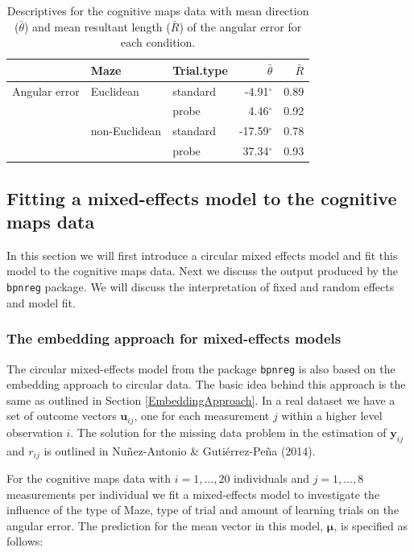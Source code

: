 \documentclass[11pt,]{article}
\begin{document}
\begin{table}
\centering
\caption{Descriptives for the cognitive maps data with mean direction ($\bar{\theta}$) and mean resultant length ($\bar{R}$) of the angular error for each condition.} 
\begin{tabular}{lllrr}
  \hline\noalign{\smallskip}
& Maze & Trial.type & $\bar{\theta}$ & $\bar{R}$  \\ \hline\noalign{\smallskip}
Angular error   & Euclidean     & standard & -4.91$^{\circ}$ & 0.89  \\
              &                   & probe    &  4.46$^{\circ}$ & 0.92   \\
                & non-Euclidean & standard & -17.59$^{\circ}$ & 0.78  \\
              &                   & probe    &  37.34$^{\circ}$ & 0.93  \\
   \hline
\end{tabular}
\label{TableDescriptivesMaps}
\end{table}

\subsection{Fitting a mixed-effects model to the cognitive maps data}\label{MEModelMaps}

In this section we will first introduce a circular mixed effects model
and fit this model to the cognitive maps data. Next we discuss the
output produced by the \verb|bpnreg| package. We will discuss the
interpretation of fixed and random effects and model fit.

\subsubsection{The embedding approach for mixed-effects models}\label{embeddingME}

The circular mixed-effects model from the package \verb|bpnreg| is also
based on the embedding approach to circular data. The basic idea behind
this approach is the same as outlined in Section
\ref{EmbeddingApproach}. In a real dataset we have a set of outcome
vectors \(\boldsymbol{u}_{ij}\), one for each measurement \(j\) within a
higher level observation \(i\). The solution for the missing data
problem in the estimation of \(\boldsymbol{y}_{ij}\) and \(r_{ij}\) is
outlined in Nuñez-Antonio \& Gutiérrez-Peña (2014).

For the cognitive maps data with \(i = 1, \dots, 20\) individuals and
\(j = 1, \dots, 8\) measurements per individual we fit a mixed-effects
model to investigate the influence of the type of Maze, type of trial
and amount of learning trials on the angular error. The prediction for
the mean vector in this model, \(\boldsymbol{\mu}\), is specified as
follows:
\end{document}
